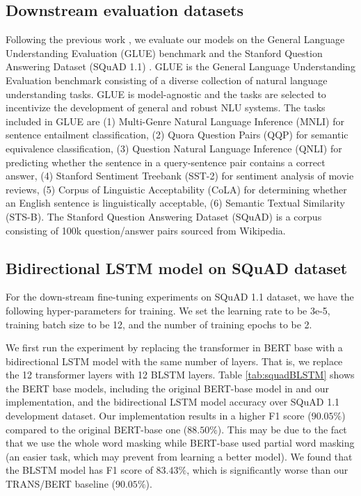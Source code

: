 \documentclass[11pt,a4paper]{article}
\begin{document}
\subsection{Downstream evaluation datasets}

Following the previous work \cite{devlin2018,yang2019,liu2019,lan2019}, we evaluate our models on the General Language Understanding Evaluation (GLUE) benchmark \cite{wang2018} and the Stanford Question Answering Dataset (SQuAD 1.1) \cite{rajpurkar2016}. GLUE is the General Language Understanding Evaluation benchmark consisting of a diverse collection of natural language understanding tasks. GLUE is model-agnostic and the tasks are selected to incentivize the development of general and robust NLU systems. The tasks included in GLUE are (1) Multi-Genre Natural Language Inference (MNLI) for sentence entailment classification, (2) Quora Question Pairs (QQP) for semantic equivalence classification, (3) Question Natural Language Inference (QNLI) for predicting whether the sentence in a query-sentence pair contains a correct answer, (4) Stanford Sentiment Treebank (SST-2) for sentiment analysis of movie reviews, (5) Corpus of Linguistic Acceptability (CoLA) for determining whether an English sentence is linguistically acceptable, (6) Semantic Textual Similarity (STS-B). The Stanford Question Answering Dataset (SQuAD) is a corpus consisting of 100k question/answer pairs sourced from Wikipedia.

\subsection{Bidirectional LSTM model on SQuAD dataset} \label{sec:blstm}
For the down-stream fine-tuning experiments on SQuAD 1.1 dataset, we have the following hyper-parameters for training. We set the learning rate to be 3e-5, training batch size to be 12, and the number of training epochs to be 2. 

We first run the experiment by replacing the transformer in BERT base with a bidirectional LSTM model with the same number of layers. That is, we replace the 12 transformer layers with 12 BLSTM layers. Table \ref{tab:squadBLSTM} shows the BERT base models, including the original BERT-base model in \cite{devlin2018} and our implementation, and the bidirectional LSTM model accuracy over SQuAD 1.1 development dataset. Our implementation results in a higher F1 score ($90.05\%$) compared to the original BERT-base one ($88.50\%$). This may be due to the fact that we use the whole word masking while BERT-base used partial word masking (an easier task, which may prevent from learning a better model). We found that the BLSTM model has F1 score of $83.43\%$, which is significantly worse than our TRANS/BERT baseline ($90.05\%$).
\end{document}
